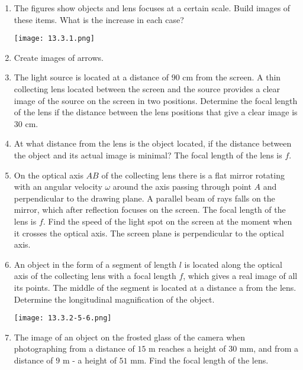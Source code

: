 \documentclass{article}
\begin{document}
\begin{enumerate}[label=13.3.\arabic*]


\item  The figures show objects and lens focuses at a certain scale. Build images of these items. What is the increase in each case?

\begin{center}
    \texttt{[image: 13.3.1.png]}
\end{center}

\item  Create images of arrows.

\item  The light source is located at a distance of $90$ cm from the screen. A thin collecting lens located between the screen and the source provides a clear image of the source on the screen in two positions. Determine the focal length of the lens if the distance between the lens positions that give a clear image is $30$ cm.

\item  At what distance from the lens is the object located, if the distance between the object and its actual image is minimal? The focal length of the lens is $f$.

\item  On the optical axis $AB$ of the collecting lens there is a flat mirror rotating with an angular velocity $\omega$ around the axis passing through point $A$ and perpendicular to the drawing plane. A parallel beam of rays falls on the mirror, which after reflection focuses on the screen. The focal length of the lens is $f$. Find the speed of the light spot on the screen at the moment when it crosses the optical axis. The screen plane is perpendicular to the optical axis.

\item  An object in the form of a segment of length $l$ is located along the optical axis of the collecting lens with a focal length $f$, which gives a real image of all its points. The middle of the segment is located at a distance a from the lens. Determine the longitudinal magnification of the object.

\begin{center}
    \texttt{[image: 13.3.2-5-6.png]}
\end{center}

\item The image of an object on the frosted glass of the camera when photographing from a distance of $15$ m reaches a height of $30$ mm, and from a distance of $9$ m - a height of $51$ mm. Find the focal length of the lens.


\end{enumerate}
\end{document}

